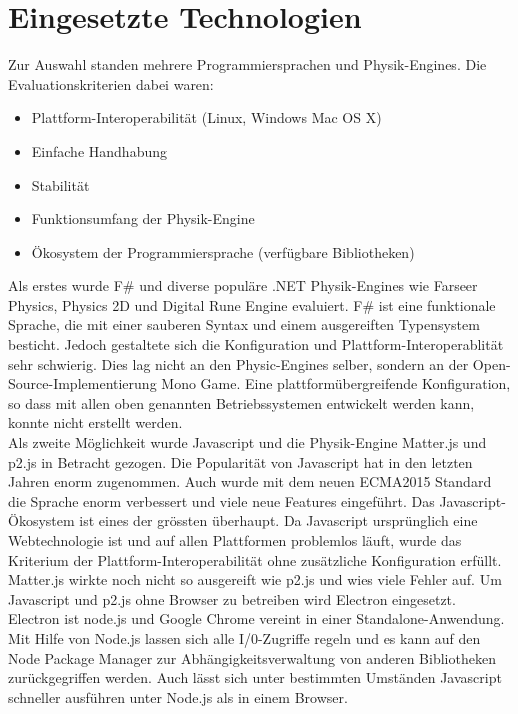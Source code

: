   \section{Eingesetzte Technologien\label{sec:Technology}}

    Zur Auswahl standen mehrere Programmiersprachen und Physik-Engines.
    Die Evaluationskriterien dabei waren:
    \begin{itemize}
      \item Plattform-Interoperabilität (Linux, Windows Mac OS X)
      \item Einfache Handhabung
      \item Stabilität
      \item Funktionsumfang der Physik-Engine
      \item Ökosystem der Programmiersprache (verfügbare Bibliotheken)
    \end{itemize}

    Als erstes wurde F\# und diverse populäre .NET Physik-Engines wie Farseer Physics,
    Physics 2D und Digital Rune Engine evaluiert.
    F\# ist eine funktionale Sprache, die mit einer sauberen Syntax und einem ausgereiften Typensystem besticht.
    Jedoch gestaltete sich die Konfiguration und Plattform-Interoperablität sehr schwierig.
    Dies lag nicht an den Physic-Engines selber, sondern an der Open-Source-Implementierung Mono Game.
    Eine plattformübergreifende Konfiguration,
    so dass mit allen oben genannten Betriebssystemen entwickelt werden kann,
    konnte nicht erstellt werden.
    \\
    Als zweite Möglichkeit wurde Javascript und die Physik-Engine Matter.js und p2.js in Betracht gezogen.
    Die Popularität von Javascript hat in den letzten Jahren enorm zugenommen.
    Auch wurde mit dem neuen ECMA2015 Standard die Sprache enorm verbessert und viele neue Features eingeführt.
    Das Javascript-Ökosystem ist eines der grössten überhaupt.
    Da Javascript ursprünglich eine Webtechnologie ist und auf allen Plattformen problemlos läuft,
    wurde das Kriterium der Plattform-Interoperabilität ohne zusätzliche Konfiguration erfüllt.
    Matter.js wirkte noch nicht so ausgereift wie p2.js und wies viele Fehler auf.
    Um Javascript und p2.js ohne Browser zu betreiben wird Electron eingesetzt.
    Electron ist node.js und Google Chrome vereint in einer Standalone-Anwendung.
    Mit Hilfe von Node.js lassen sich alle I/0-Zugriffe regeln und es kann auf den
    Node Package Manager zur Abhängigkeitsverwaltung von anderen Bibliotheken zurückgegriffen werden.
    Auch lässt sich unter bestimmten Umständen Javascript schneller ausführen unter Node.js als in einem Browser.

